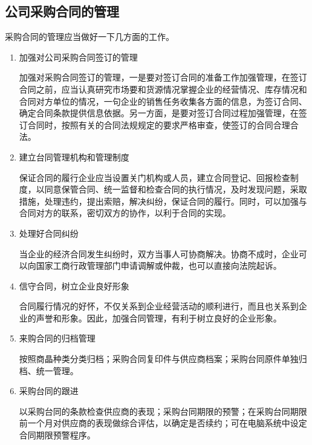 \subsection {公司采购合同的管理}

    采购合同的管理应当做好一下几方面的工作。

    \begin{enumerate}
        \item 加强对公司采购合同签订的管理

        加强对采购合同签订的管理，一是要对签订合同的准备工作加强管理，在签订合同之前，应当认真研究市场要和货源情况掌握企业的经营情况、库存情况和合同对方单位的情况，一句企业的销售任务收集各方面的信息，为签订合同、确定合同条款提供信息依据。另一方面，是要对签订合同过程加强管理，在签订合同时，按照有关的合同法规规定的要求严格审查，使签订的合同合理合法。

        \item 建立台同管理机构和管理制度

        保证合同的履行企业应当设置关门机构或人员，建立合同登记、回报检查制度，以同意保管合同、统一监督和检查合同的执行情况，及时发现问题，采取措施，处理违约，提出索赔，解决纠纷，保证合同的履行。同时，可以加强与合同对方的联系，密切双方的协作，以利于合同的实现。

        \item 处理好合同纠纷

        当企业的经济合同发生纠纷时，双方当事人可协商解决。协商不成时，企业可以向国家工商行政管理部门申请调解或仲裁，也可以直接向法院起诉。

        \item 信守合同，树立企业良好形象

        合同履行情况的好怀，不仅关系到企业经营活动的顺利进行，而且也关系到企业的声誉和形象。因此，加强合同管理，有利于树立良好的企业形象。

        \item 来购合同的归档管理

        按照商晶种类分类归档；采购合同复印件与供应商档案；采购台同原件单独归档、统一管理。

        \item 采购台同的跟进

        以采购台同的条款检查供应商的表现；采购台同期限的预警；在采购台同期限前一个月对供应商的表现做综合评估，以确定是否续约；可在电脑系统中设定合同期限预警程序。

    \end{enumerate}

